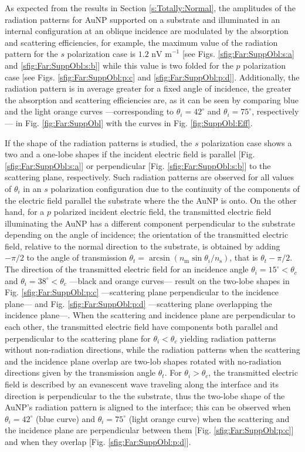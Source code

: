 As expected from the results in Section \ref{s:Totally:Normal}, the amplitudes of the radiation patterns for AuNP supported on a substrate and illuminated in an internal configuration at an oblique incidence are modulated by the absorption and scattering efficiencies, for example, the maximum value of the radiation pattern for the $s$ polarization case is $1.2 \text{ nV m}^{-1}$ [see Figs. \ref{sfig:Far:SuppObl:s:a} and \ref{sfig:Far:SuppObl:s:b}] while this value is two folded for the $p$ polarization case [see Figs. \ref{sfig:Far:SuppObl:p:c} and \ref{sfig:Far:SuppObl:p:d}]. Additionally, the radiation pattern is in average greater for a fixed angle of incidence, the greater the absorption and scattering efficiencies are, as it can be seen by comparing blue and the light orange curves ---corresponding to $\theta_i = 42^\circ$ and $\theta_i = 75^\circ$, respectively--- in Fig. \ref{fig:Far:SuppObl} with the curves in Fig. \ref{fig:SuppObl:Eff}.

If the shape of the radiation patterns is studied, the $s$ polarization case shows a two and a one-lobe shapes if the incident electric field is parallel [Fig. \ref{sfig:Far:SuppObl:s:a}] or perpendicular [Fig. \ref{sfig:Far:SuppObl:s:b}] to the scattering plane, respectively. Such radiation patterns are observed for all values of $\theta_i$ in an $s$ polarization configuration due to the continuity of the components of the electric field parallel the substrate where the the AuNP is onto. On the other hand, for a $p$ polarized incident electric field, the transmitted electric field illuminating the AuNP has a different component perpendicular to the substrate depending on the angle of incidence; the orientation of the transmitted electric field, relative to the normal direction to the substrate, is obtained by adding $-\pi/2$ to the angle of transmission $\theta_t = \arcsin(n_\text{m}\sin\theta_i/n_\text{s})$, that is $\theta_t - \pi/2$. The direction of the transmitted electric field for an incidence angle $\theta_i = 15^\circ<\theta_c$ and $\theta_i = 38^\circ<\theta_c$ ---black and orange curves--- result on the two-lobe shapes  in Fig. \ref{sfig:Far:SuppObl:p:c} ---scattering plane perpendicular to the incidence plane--- and Fig. \ref{sfig:Far:SuppObl:p:d} ---scattering plane overlapping the incidence plane---. When the scattering and incidence plane are perpendicular to each other, the transmitted electric field have components both parallel and perpendicular to the scattering plane for $\theta_i<\theta_c$ yielding radiation patterns without non-radiation directions, while the radiation patterns when the scattering and the incidence plane overlap are two-lob shapes rotated with no-radiation directions given by the transmission angle $\theta_t$. For $\theta_i>\theta_c$, the transmitted electric field is described by an evanescent wave traveling along the interface and its direction is perpendicular to the the substrate, thus the two-lobe shape of the AuNP's radiation pattern is aligned to the interface; this can be observed when $\theta_i = 42^\circ$ (blue curve) and $\theta_i = 75^\circ$ (light orange curve) when the scattering and the incidence plane are perpendicular between them [Fig. \ref{sfig:Far:SuppObl:p:c}] and when they overlap [Fig. \ref{sfig:Far:SuppObl:p:d}].

